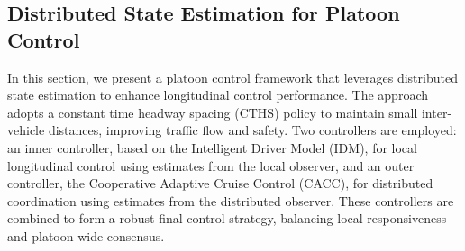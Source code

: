 \documentclass[letterpaper, 10pt, conference]{ieeeconf}  %
\begin{document}





\subsection{Distributed State Estimation for Platoon Control}
In this section, we present a platoon control framework that leverages distributed state estimation to enhance longitudinal control performance. The approach adopts a constant time headway spacing (CTHS) policy to maintain small inter-vehicle distances, improving traffic flow and safety. Two controllers are employed: an inner controller, based on the Intelligent Driver Model (IDM), for local longitudinal control using estimates from the local observer, and an outer controller, the Cooperative Adaptive Cruise Control (CACC), for distributed coordination using estimates from the distributed observer. These controllers are combined to form a robust final control strategy, balancing local responsiveness and platoon-wide consensus.
\end{document}
